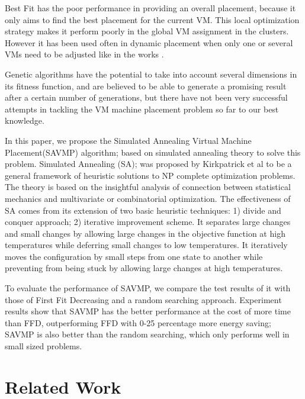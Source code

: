 \documentclass[10pt, conference, compsocconf]{IEEEtran}
\begin{document}
Best Fit has the poor performance in providing an overall placement, because it
only aims to find the best placement for the current VM. This local optimization
strategy makes it perform poorly in the global VM assignment in the clusters.
However it has been used often in dynamic placement when only one or several VMs
need to be adjusted like in the works \cite{calheiros11}\cite{beloglazov10}.

Genetic algorithms have the potential to take into account several dimensions in
its fitness function, and are believed to be able to generate a promising result
after a certain number of generations, but there have not been very successful
attempts in tackling the VM machine placement problem so far to our best
knowledge.

In this paper, we propose the Simulated Annealing Virtual Machine Placement(SAVMP)
algorithm; based on simulated annealing theory to solve this problem.
Simulated Annealing (SA); was proposed by Kirkpatrick et al\cite{kirkpatrick83}
to be a general framework of heuristic solutions to NP complete optimization problems.
The theory is based on the insightful analysis of connection between statistical
mechanics and multivariate or combinatorial optimization. The effectiveness of
SA comes from its extension of two basic heuristic techniques: 1) divide and
conquer approach; 2) iterative improvement scheme. It separates large changes
and small changes by allowing large changes in the objective function at high
temperatures while deferring small changes to low temperatures. It iteratively
moves the configuration by small steps from one state to another while
preventing from being stuck by allowing large changes at high temperatures.

To evaluate the performance of SAVMP, we compare the test results of it with
those of First Fit Decreasing and a random searching approach. Experiment results show that SAVMP has the better
performance at the cost of more time than FFD, outperforming FFD with 0-25
percentage more energy saving; SAVMP is also better than the random searching, which only performs well in small sized problems.

\section{Related Work}
\end{document}
